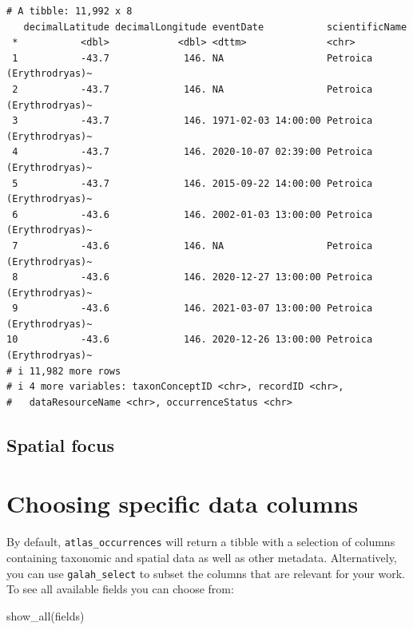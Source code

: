 \documentclass[
  letterpaper,
  DIV=11,
  numbers=noendperiod,
  oneside]{scrreprt}
\newenvironment{Shaded}{\begin{snugshade}}{\end{snugshade}}
\newcommand{\FunctionTok}[1]{\textcolor[rgb]{0.28,0.35,0.67}{#1}}
\newcommand{\NormalTok}[1]{\textcolor[rgb]{0.00,0.23,0.31}{#1}}
\begin{document}
\begin{verbatim}
# A tibble: 11,992 x 8
   decimalLatitude decimalLongitude eventDate           scientificName          
 *           <dbl>            <dbl> <dttm>              <chr>                   
 1           -43.7             146. NA                  Petroica (Erythrodryas)~
 2           -43.7             146. NA                  Petroica (Erythrodryas)~
 3           -43.7             146. 1971-02-03 14:00:00 Petroica (Erythrodryas)~
 4           -43.7             146. 2020-10-07 02:39:00 Petroica (Erythrodryas)~
 5           -43.7             146. 2015-09-22 14:00:00 Petroica (Erythrodryas)~
 6           -43.6             146. 2002-01-03 13:00:00 Petroica (Erythrodryas)~
 7           -43.6             146. NA                  Petroica (Erythrodryas)~
 8           -43.6             146. 2020-12-27 13:00:00 Petroica (Erythrodryas)~
 9           -43.6             146. 2021-03-07 13:00:00 Petroica (Erythrodryas)~
10           -43.6             146. 2020-12-26 13:00:00 Petroica (Erythrodryas)~
# i 11,982 more rows
# i 4 more variables: taxonConceptID <chr>, recordID <chr>,
#   dataResourceName <chr>, occurrenceStatus <chr>
\end{verbatim}

\hypertarget{spatial-focus}{%
\subsection{Spatial focus}\label{spatial-focus}}

\hypertarget{choosing-specific-data-columns}{%
\section{Choosing specific data
columns}\label{choosing-specific-data-columns}}

By default, \texttt{atlas\_occurrences} will return a tibble with a
selection of columns containing taxonomic and spatial data as well as
other metadata. Alternatively, you can use \texttt{galah\_select} to
subset the columns that are relevant for your work. To see all available
fields you can choose from:

\begin{Shaded}
\begin{Highlighting}[]
\FunctionTok{show\_all}\NormalTok{(fields) }
\end{Highlighting}
\end{Shaded}
\end{document}
